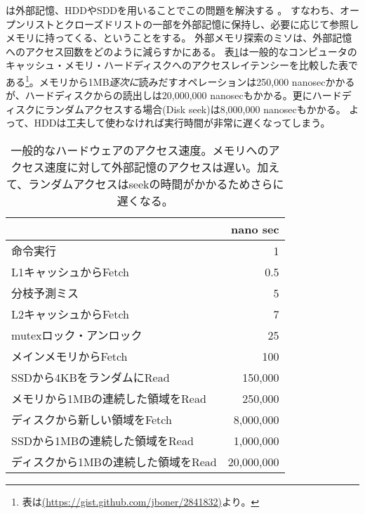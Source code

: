 は外部記憶、HDDやSDDを用いることでこの問題を解決する \cite{chiang1995external}。
すなわち、オープンリストとクローズドリストの一部を外部記憶に保持し、必要に応じて参照しメモリに持ってくる、ということをする。
外部メモリ探索のミソは、外部記憶へのアクセス回数をどのように減らすかにある。
表\ref{tbl:latency}は一般的なコンピュータのキャッシュ・メモリ・ハードディスクへのアクセスレイテンシーを比較した表である\footnote{表は\url{(https://gist.github.com/jboner/2841832)}より。}。メモリから1MB{\it 逐次に}読みだすオペレーションは250,000 nanosecかかるが、ハードディスクからの読出しは20,000,000 nanosecもかかる。更にハードディスクにランダムアクセスする場合(Disk seek)は8,000,000 nanosecもかかる。
よって、HDDは工夫して使わなければ実行時間が非常に遅くなってしまう。%



\begin{table}
\centering
\caption{一般的なハードウェアのアクセス速度。メモリへのアクセス速度に対して外部記憶のアクセスは遅い。加えて、ランダムアクセスはseekの時間がかかるためさらに遅くなる。 }
\label{tbl:latency}
\begin{tabular}{|l|r|}
		   & nano sec \\ \hline
	命令実行 & 1 \\
	L1キャッシュからFetch & 0.5 \\
	分枝予測ミス 		& 5 \\
	L2キャッシュからFetch & 7 \\
	mutexロック・アンロック			& 25 \\
	メインメモリからFetch  	& 100 \\
	SSDから4KBをランダムにRead         & 150,000 \\
	メモリから1MBの連続した領域をRead & 250,000 \\
	ディスクから新しい領域をFetch & 8,000,000 \\
	SSDから1MBの連続した領域をRead		& 1,000,000 \\
	ディスクから1MBの連続した領域をRead 	& 20,000,000 \\
	
\end{tabular}
\end{table}


